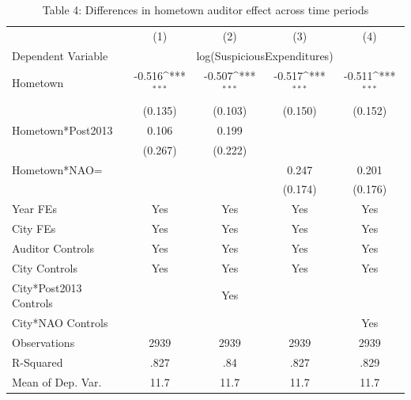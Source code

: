 \begin{table}[p]\centering\captionsetup{width=\textwidth,labelformat=empty}\begin{threeparttable}\footnotesize{
\def\sym#1{\ifmmode^{#1}\else\(^{#1}\)\fi}
\caption{Table 4: Differences in hometown auditor effect across time periods}
\begin{tabular}{l*{4}{c}}
\hline\hline
                    &\multicolumn{1}{c}{(1)}         &\multicolumn{1}{c}{(2)}         &\multicolumn{1}{c}{(3)}         &\multicolumn{1}{c}{(4)}         \\
Dependent Variable & \multicolumn{4}{c}{ log(SuspiciousExpenditures) }  \\
\hline
Hometown            &      -0.516\sym{***}&      -0.507\sym{***}&      -0.517\sym{***}&      -0.511\sym{***}\\
                    &     (0.135)         &     (0.103)         &     (0.150)         &     (0.152)         \\
Hometown*Post2013   &       0.106         &       0.199         &                     &                     \\
                    &     (0.267)         &     (0.222)         &                     &                     \\
Hometown*NAO=       &                     &                     &       0.247         &       0.201         \\
                    &                     &                     &     (0.174)         &     (0.176)         \\
\hline
Year FEs               & Yes & Yes & Yes & Yes \\
City FEs               & Yes & Yes & Yes & Yes \\
Auditor Controls       & Yes & Yes & Yes & Yes \\
City Controls          & Yes & Yes & Yes & Yes \\
City*Post2013 Controls &     & Yes &     &     \\
City*NAO Controls      &     &     &     & Yes \\
\hline
Observations        &        2939         &        2939         &        2939         &        2939         \\
R-Squared           &        .827         &         .84         &        .827         &        .829         \\
Mean of Dep. Var.   &        11.7         &        11.7         &        11.7         &        11.7         \\

\end{tabular}}
\end{threeparttable}
\end{table}
